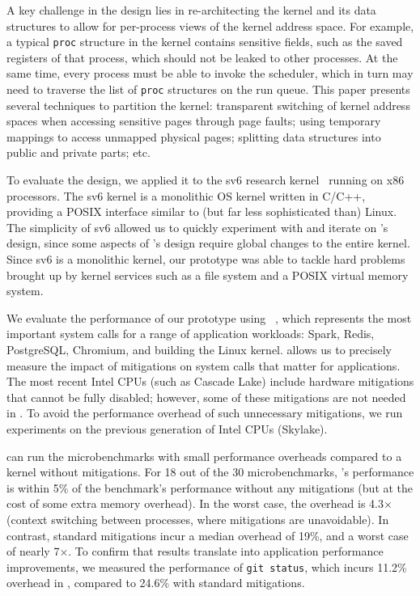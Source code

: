 A key challenge in the \sys design lies in re-architecting the kernel
and its data structures to allow for per-process views of the
kernel address space.  For example, a typical \texttt{proc} structure in
the kernel contains sensitive fields, such as the saved registers of that
process, which should not be leaked to other processes.  At the same time,
every process must be able to invoke the scheduler, which in turn may
need to traverse the list of \texttt{proc} structures on the run queue.
This paper presents several techniques to partition the kernel:
transparent switching of kernel address spaces when accessing sensitive
pages through page faults; using temporary mappings to access unmapped
physical pages; splitting data structures into public and private
parts; etc.

To evaluate the \sys design, we applied it to the sv6 research
kernel~\cite{clements:sc} running on x86 processors.  The sv6 kernel
is a monolithic OS kernel written in C/C++, providing a POSIX
interface similar to (but far less sophisticated than) Linux.  The
simplicity of sv6 allowed us to quickly experiment with and iterate on
\sys's design, since some aspects of \sys's design require global
changes to the entire kernel.  Since sv6 is a monolithic kernel,
our prototype was able to tackle hard problems brought up by kernel
services such as a file system and a POSIX virtual memory system.

We evaluate the performance of our \sys prototype using
\bench~\cite{lebench}, which represents the most important system calls
for a range of application workloads: Spark, Redis, PostgreSQL,
Chromium, and building the Linux kernel.  \bench allows us to precisely
measure the impact of mitigations on system calls that matter
for applications.  The most recent Intel CPUs (such as Cascade Lake)
include hardware mitigations that cannot be fully disabled; however, some of
these mitigations are not needed in \sys.  To avoid the performance
overhead of such unnecessary mitigations, we run experiments on
the previous generation of Intel CPUs (Skylake).

\sys can run the \bench microbenchmarks with small performance
overheads compared to a kernel without mitigations.  For 18 out of
the 30 \bench microbenchmarks, \sys's performance is within 5\% of the
benchmark's performance without any mitigations (but at the cost of some
extra memory overhead).  In the worst case, the overhead is 4.3$\times$
(context switching between processes, where mitigations are unavoidable).
In contrast, standard mitigations incur a median overhead of 19\%, and
a worst case of nearly 7$\times$.  To confirm that \bench results translate
into application performance improvements, we measured the performance
of \texttt{git status}, which incurs 11.2\% overhead in \sys, compared
to 24.6\% with standard mitigations.

